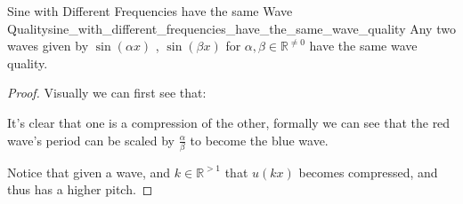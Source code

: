 \begin{proposition}{Sine with Different Frequencies have the same Wave
Quality}{sine_with_different_frequencies_have_the_same_wave_quality}
    Any two waves given by \( \sin  \left( \alpha x \right) \) , \( \sin
    \left( \beta x \right) \) for \( \alpha , \beta  \in \mathbb{R} ^{ \neq 0 }
    \) have the same wave quality.
\end{proposition}
\begin{proof}
    Visually we can first see that:
    \begin{center}
    \end{center}

    It's clear that one is a compression of the other, formally we can see that
    the red wave's period can be scaled by \( \frac{\alpha }{\beta } \) to
    become the blue wave.

  Notice that given a wave, and $ k \in \mathbb{R} ^{> 1}$ that $ u\left(kx\right)$ becomes compressed, and thus has a higher pitch.
\end{proof}
